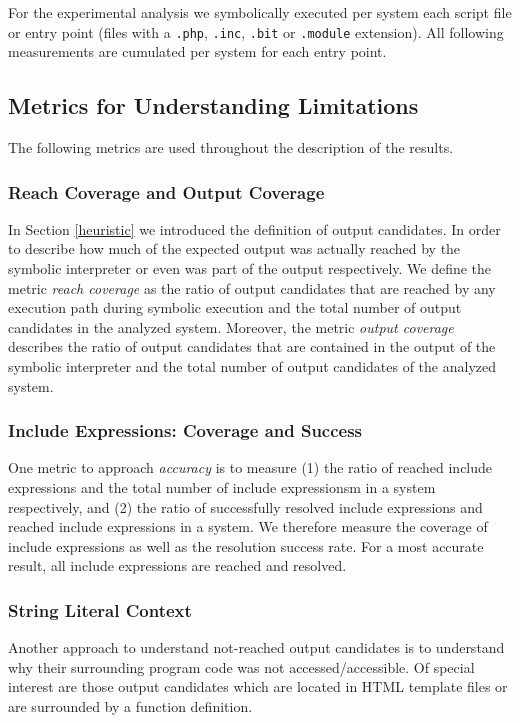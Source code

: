 \documentclass{sig-alternate-05-2015}
\begin{document}
For the experimental analysis we symbolically executed per system each script file or entry point (files with a \texttt{.php}, \texttt{.inc}, \texttt{.bit} or \texttt{.module} extension). All following measurements are cumulated per system for each entry point. 

\subsection{Metrics for Understanding Limitations} \label{metrics}
The following metrics are used throughout the description of the results. 

\subsubsection{Reach Coverage and Output Coverage} \label{coverage_section}
In Section \ref{heuristic} we introduced the definition of output candidates. In
order to describe how much of the expected output was actually reached by the
symbolic interpreter or even was part of the output respectively.
We define the metric \emph{reach coverage} as the ratio of output candidates
that are reached by any execution path during symbolic execution and the total
number of output candidates in the analyzed system. Moreover, the metric \emph{output coverage} describes the ratio of output
candidates that are contained in the output of the symbolic interpreter and the total
number of output candidates of the analyzed system. 

\subsubsection{Include Expressions: Coverage and Success} \label{include_coverage_section}
One metric to approach \emph{accuracy} is to measure (1) the ratio of reached
include expressions and the total number of include expressionsm in a system
respectively, and (2) the ratio of successfully resolved include expressions and
reached include expressions in a system. We therefore measure the coverage
of include expressions as well as the resolution success rate. For a most
accurate result, all include expressions are reached and resolved.

\subsubsection{String Literal Context} \label{context_section}
Another approach to understand not-reached output candidates is to understand why their surrounding program code was not accessed/accessible. Of special interest are those output candidates which are located in HTML template files or are surrounded by a function definition. 
\end{document}
